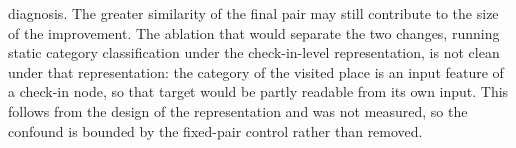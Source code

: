 \begin{enumerate}
    diagnosis. The greater similarity of
    the final pair may still contribute to the size of the improvement. The
    ablation that would separate the two changes,
    running static category classification under the check-in-level representation, is
    not clean under that representation: the category of the visited place is an input
    feature of a check-in node, so that target would be partly readable from its own
    input. This follows from the design of the representation and was not measured, so
    the confound is bounded by the fixed-pair control rather than removed.

\end{enumerate}
